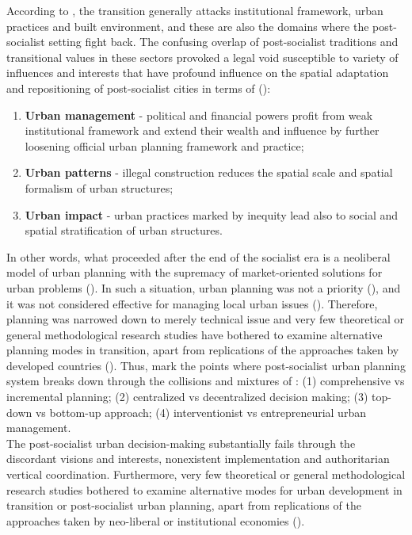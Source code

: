 \documentclass[11pt]{report}
\begin{document}
According to \href{Sykora}{\cite{Sykora and Bouzarovski (2012)}}, the transition generally attacks institutional framework, urban practices and built environment, and these are also the domains where the post-socialist setting fight back.
The confusing overlap of post-socialist traditions and transitional values in these sectors provoked a legal void susceptible to variety of influences and interests that have profound influence on the spatial adaptation and repositioning of post-socialist cities in terms of (\citealt{Stanilov 2007}): 

\begin{enumerate}
\item \textbf{Urban management} - political and financial powers profit from weak institutional framework and extend their wealth and influence by further loosening official urban planning framework and practice; 
\item \textbf{Urban patterns} - illegal construction reduces the spatial scale and spatial formalism of urban structures; 
\item \textbf{Urban impact} - urban practices marked by inequity lead also to social and spatial stratification of urban structures.
\end{enumerate}
 
In other words, what proceeded after the end of the socialist era is a neoliberal model of urban planning with the supremacy of market-oriented solutions for urban problems (\citealt{Sager 2011}).
In such a situation, urban planning was not a priority (\citealt{Sykola, 1999}), and it was not considered effective for managing local urban issues (\citealt{Maier, 1998; M. Vujosevic and Nedovic-Budic, 2006}).
Therefore, planning was narrowed down to merely technical issue and very few theoretical or general methodological research studies have bothered to examine alternative planning modes in transition, apart from replications of the approaches taken by developed countries (\citealt{Begovic, 1995}).
Thus, \href{Zekovic}{\cite{Zekovic et al. (2015)}} mark the points where post-socialist urban planning system breaks down through the collisions and mixtures of :
(1) comprehensive vs incremental planning; 
(2) centralized vs decentralized decision making;
(3) top-down vs bottom-up approach;
(4) interventionist vs entrepreneurial urban management.
\\

The post-socialist urban decision-making substantially fails through the discordant visions and interests, nonexistent implementation and authoritarian vertical coordination.
Furthermore, very few theoretical or general methodological research studies bothered to examine alternative  modes  for  urban  development  in  transition or post-socialist urban planning,  apart  from  replications  of  the  approaches  taken  by  neo-liberal  or institutional economies (\cite{Tsenkova 2007}).
\end{document}
